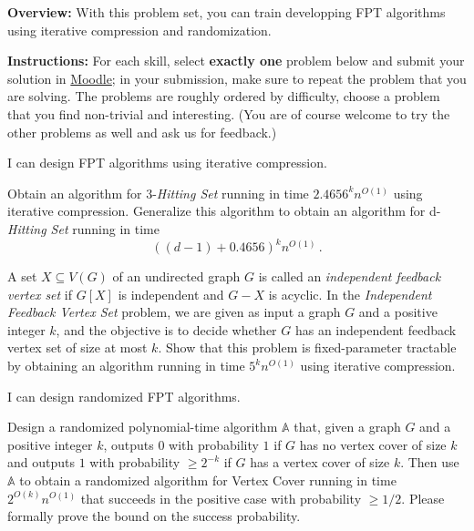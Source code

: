 \documentclass[english]{uebung_cs}
\begin{document}
\textbf{Overview:} With this problem set, you can train developping FPT algorithms using iterative compression and randomization.

\textbf{Instructions:} For each skill, select \textbf{exactly one} problem below and submit your solution in \href{https://moodle.studiumdigitale.uni-frankfurt.de/moodle/course/view.php?id=6259}{Moodle}; in your submission, make sure to repeat the problem that you are solving.
The problems are roughly ordered by difficulty, choose a problem that you find non-trivial and interesting. (You are of course welcome to try the other problems as well and ask us for feedback.)

\begin{skill}
  I can design FPT algorithms using iterative compression.
\end{skill}

\begin{exercise}
Obtain an algorithm for 3-\emph{Hitting Set} running in time $2.4656^kn^{O(1)}$ using iterative compression. Generalize this algorithm to obtain an algorithm for d-\emph{Hitting Set} running in time \[((d-1)+0.4656)^kn^{O(1)} \,. \]
\end{exercise}

\begin{exercise}
  A set $X \subseteq V(G)$ of an undirected graph $G$ is called an \emph{independent feedback vertex set} if $G[X]$ is independent and $G - X$ is acyclic. In the \emph{Independent Feedback Vertex Set} problem, we are given as input a graph $G$ and a positive integer $k$, and the objective is to decide whether $G$ has an independent feedback vertex set of size at most $k$. Show that this problem is fixed-parameter tractable by obtaining an algorithm running in time $5^kn^{O(1)}$ using iterative compression.
\end{exercise}
  
\begin{skill}[Randomization]
  I can design randomized FPT algorithms.
\end{skill}

\begin{exercise}
Design a randomized polynomial-time algorithm $\mathbb{A}$ that, given a graph $G$ and a positive integer $k$, outputs $0$ with probability $1$ if $G$ has no vertex cover of size $k$ and outputs $1$ with probability $\geq 2^{-k}$ if $G$ has a vertex cover of size $k$.
Then use $\mathbb{A}$ to obtain a randomized algorithm for Vertex Cover running in time $2^{O(k)} n^{O(1)}$ that succeeds in the positive case with probability $\geq 1/2$. Please formally prove the bound on the success probability.
\end{exercise}
\end{document}

